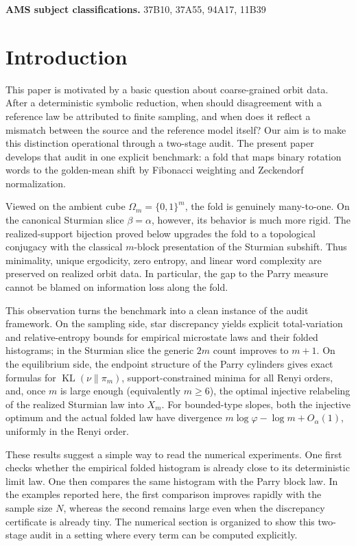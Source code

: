 \documentclass[11pt,letterpaper]{article}
\numberwithin{equation}{section}
\theoremstyle{plain}
\theoremstyle{definition}
\theoremstyle{remark}
\DeclareMathOperator{\KL}{KL}
\begin{document}
\medskip
\noindent\textbf{AMS subject classifications.} 37B10, 37A55, 94A17, 11B39

\section{Introduction}

This paper is motivated by a basic question about coarse-grained orbit data.
After a deterministic symbolic reduction, when should disagreement with a
reference law be attributed to finite sampling, and when does it reflect a
mismatch between the source and the reference model itself? Our aim is to make
this distinction operational through a two-stage audit. The present paper
develops that audit in one explicit benchmark: a fold that maps binary rotation
words to the golden-mean shift by Fibonacci weighting and Zeckendorf
normalization.

Viewed on the ambient cube \(\Omega_m=\{0,1\}^m\), the fold is genuinely
many-to-one. On the canonical Sturmian slice \(\beta=\alpha\), however, its
behavior is much more rigid. The realized-support bijection proved below
upgrades the fold to a topological conjugacy with the classical \(m\)-block
presentation of the Sturmian subshift. Thus minimality, unique ergodicity,
zero entropy, and linear word complexity are preserved on realized orbit data.
In particular, the gap to the Parry measure cannot be blamed on information
loss along the fold.

This observation turns the benchmark into a clean instance of the audit
framework. On the sampling side, star discrepancy yields explicit
total-variation and relative-entropy bounds for empirical microstate laws and
their folded histograms; in the Sturmian slice the generic \(2m\) count
improves to \(m+1\). On the equilibrium side, the endpoint structure of the
Parry cylinders gives exact formulas for \(\KL(\nu\|\pi_m)\),
support-constrained minima for all Renyi orders, and, once \(m\) is large
enough (equivalently \(m\ge 6\)), the optimal injective relabeling of the
realized Sturmian law into \(X_m\). For bounded-type slopes, both the injective
optimum and the actual folded law have divergence
\(m\log\varphi-\log m+O_\alpha(1)\), uniformly in the Renyi order.

These results suggest a simple way to read the numerical experiments. One first
checks whether the empirical folded histogram is already close to its
deterministic limit law. One then compares the same histogram with the Parry
block law. In the examples reported here, the first comparison improves rapidly
with the sample size \(N\), whereas the second remains large even when the
discrepancy certificate is already tiny. The numerical section is organized to
show this two-stage audit in a setting where every term can be computed
explicitly.
\end{document}
